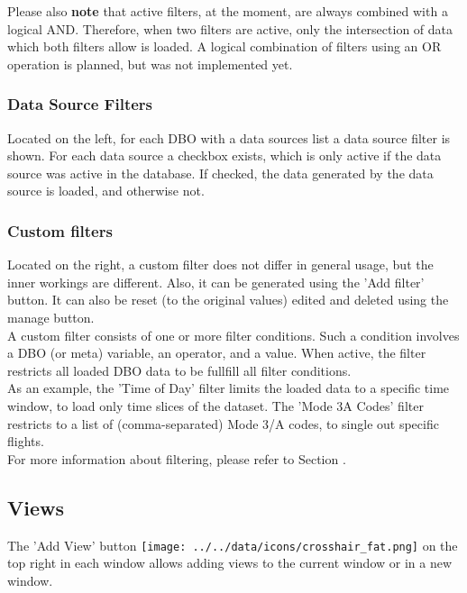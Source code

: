 Please also \textbf{note} that active filters, at the moment, are always combined with a logical AND. Therefore,
when  two  filters  are  active,  only  the  intersection  of  data  which  both  filters  allow  is  loaded.   A  logical combination of filters using an OR operation is planned, but was not implemented yet.

\subsubsection{Data Source Filters}
Located on the left, for each DBO with a data sources list a data source filter is shown. For each
data source a checkbox exists, which is only active if the data source was active in the database. If checked, the
data generated by the data source is loaded, and otherwise not.

\subsubsection{Custom filters}
Located on the right, a custom filter does not differ in general  usage, but the inner workings are different. Also, it can be generated using the 'Add filter' button. It can also be reset (to the original values) edited and deleted using the manage button. \\

A custom filter consists of one or more filter conditions.  Such a condition involves a DBO (or meta) variable, an operator, and a value.  When active, the filter restricts all loaded DBO data to be fullfill all filter conditions. \\

As an example, the 'Time of Day' filter limits the loaded data to a specific time window, to load only time slices of the dataset.  The 'Mode 3A Codes' filter restricts to a list of (comma-separated) Mode 3/A codes, to single out specific flights. \\

For more information about filtering, please refer to Section .

\subsection{Views}
The 'Add View' button \texttt{[image: ../../data/icons/crosshair\_fat.png]} on the top right in each window allows adding views to the current window or in a new window. \\

